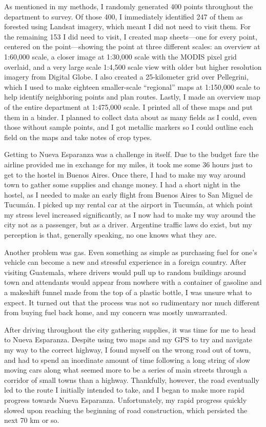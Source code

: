 As mentioned in my methods, I randomly generated 400 points throughout the department to survey. Of those 400, I immediately identified 247 of them as forested using Landsat imagery, which meant I did not need to visit them. For the remaining 153 I did need to visit, I created map sheets—one for every point, centered on the point—showing the point at three different scales: an overview at 1:60,000 scale, a closer image at 1:30,000 scale with the MODIS pixel grid overlaid, and a very large scale 1:4,500 scale view with older but higher resolution imagery from Digital Globe. I also created a 25-kilometer grid over Pellegrini, which I used to make eighteen smaller-scale ``regional'' maps at 1:150,000 scale to help identify neighboring points and plan routes. Lastly, I made an overview map of the entire department at 1:475,000 scale. I printed all of these maps and put them in a binder. I planned to collect data about as many fields as I could, even those without sample points, and I got metallic markers so I could outline each field on the maps and take notes of crop types.

Getting to Nueva Esparanza was a challenge in itself. Due to the budget fare the airline provided me in exchange for my miles, it took me some 36 hours just to get to the hostel in Buenos Aires. Once there, I had to make my way around town to gather some supplies and change money. I had a short night in the hostel, as I needed to make an early flight from Buenos Aires to San Miguel de Tucumán. I picked up my rental car at the airport in Tucumán, at which point my stress level increased significantly, as I now had to make my way around the city not as a passenger, but as a driver. Argentine traffic laws do exist, but my perception is that, generally speaking, no one knows what they are.

Another problem was gas. Even something as simple as purchasing fuel for one’s vehicle can become a new and stressful experience in a foreign country. After visiting Guatemala, where drivers would pull up to random buildings around town and attendants would appear from nowhere with a container of gasoline and a makeshift funnel made from the top of a plastic bottle, I was unsure what to expect. It turned out that the process was not so rudimentary nor much different from buying fuel back home, and my concern was mostly unwarranted.

After driving throughout the city gathering supplies, it was time for me to head to Nueva Esparanza. Despite using two maps and my GPS to try and navigate my way to the correct highway, I found myself on the wrong road out of town, and had to spend an inordinate amount of time following a long string of slow moving cars along what seemed more to be a series of main streets through a corridor of small towns than a highway. Thankfully, however, the road eventually led to the route I initially intended to take, and I began to make more rapid progress towards Nueva Esparanza.
Unfortunately, my rapid progress quickly slowed upon reaching the beginning of road construction, which persisted the next 70 km or so.

